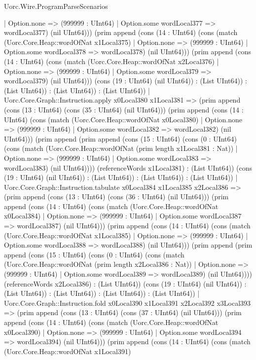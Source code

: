 \begin{lexlean}{Uorc.Wire.ProgramParseScenarios}
\begin{semanticmodule}
{      | Option.none => (999999 : UInt64)
      | Option.some wordLocal377 => wordLocal377) (nil UInt64))) (prim append (cons (14 : UInt64) (cons (match (Uorc.Core.Heap::wordOfNat x1Local375)
      | Option.none => (999999 : UInt64)
      | Option.some wordLocal378 => wordLocal378) (nil UInt64))) (prim append (cons (14 : UInt64) (cons (match (Uorc.Core.Heap::wordOfNat x2Local376)
      | Option.none => (999999 : UInt64)
      | Option.some wordLocal379 => wordLocal379) (nil UInt64))) (cons (19 : UInt64) (nil UInt64)) : (List UInt64)) : (List UInt64)) : (List UInt64)) : (List UInt64))
    | Uorc.Core.Graph::Instruction.apply x0Local380 x1Local381 => (prim append (cons (13 : UInt64) (cons (35 : UInt64) (nil UInt64))) (prim append (cons (14 : UInt64) (cons (match (Uorc.Core.Heap::wordOfNat x0Local380)
      | Option.none => (999999 : UInt64)
      | Option.some wordLocal382 => wordLocal382) (nil UInt64))) (prim append (prim append (cons (15 : UInt64) (cons (0 : UInt64) (cons (match (Uorc.Core.Heap::wordOfNat (prim length x1Local381 : Nat))
      | Option.none => (999999 : UInt64)
      | Option.some wordLocal383 => wordLocal383) (nil UInt64)))) (referenceWords x1Local381) : (List UInt64)) (cons (19 : UInt64) (nil UInt64)) : (List UInt64)) : (List UInt64)) : (List UInt64))
    | Uorc.Core.Graph::Instruction.tabulate x0Local384 x1Local385 x2Local386 => (prim append (cons (13 : UInt64) (cons (36 : UInt64) (nil UInt64))) (prim append (cons (14 : UInt64) (cons (match (Uorc.Core.Heap::wordOfNat x0Local384)
      | Option.none => (999999 : UInt64)
      | Option.some wordLocal387 => wordLocal387) (nil UInt64))) (prim append (cons (14 : UInt64) (cons (match (Uorc.Core.Heap::wordOfNat x1Local385)
      | Option.none => (999999 : UInt64)
      | Option.some wordLocal388 => wordLocal388) (nil UInt64))) (prim append (prim append (cons (15 : UInt64) (cons (0 : UInt64) (cons (match (Uorc.Core.Heap::wordOfNat (prim length x2Local386 : Nat))
      | Option.none => (999999 : UInt64)
      | Option.some wordLocal389 => wordLocal389) (nil UInt64)))) (referenceWords x2Local386) : (List UInt64)) (cons (19 : UInt64) (nil UInt64)) : (List UInt64)) : (List UInt64)) : (List UInt64)) : (List UInt64))
    | Uorc.Core.Graph::Instruction.fold x0Local390 x1Local391 x2Local392 x3Local393 => (prim append (cons (13 : UInt64) (cons (37 : UInt64) (nil UInt64))) (prim append (cons (14 : UInt64) (cons (match (Uorc.Core.Heap::wordOfNat x0Local390)
      | Option.none => (999999 : UInt64)
      | Option.some wordLocal394 => wordLocal394) (nil UInt64))) (prim append (cons (14 : UInt64) (cons (match (Uorc.Core.Heap::wordOfNat x1Local391)
}
\end{semanticmodule}
\end{lexlean}
